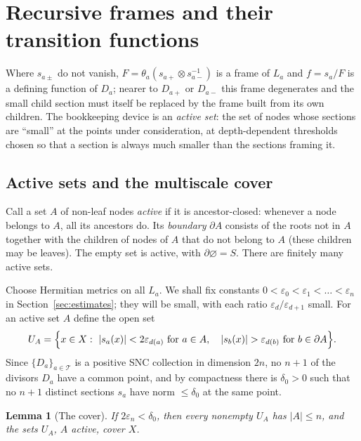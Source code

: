 \documentclass[11pt]{article}
\newtheorem{lemma}[theorem]{Lemma}
\theoremstyle{remark}
\newcommand{\eps}{\varepsilon}
\newcommand{\cT}{\mathcal T}
\begin{document}
\section{Recursive frames and their transition functions}\label{sec:frames}

Where $s_{a\pm}$ do not vanish, $F=\theta_a(s_{a+}\otimes s_{a-}^{-1})$
is a frame of $L_a$ and $f=s_a/F$ is a defining function of $D_a$;
nearer to $D_{a+}$ or $D_{a-}$ this frame degenerates and the small
child section must itself be replaced by the frame built from its own
children. The bookkeeping device is an \emph{active set}: the set of nodes
whose sections are ``small'' at the points under consideration, at
depth-dependent thresholds chosen so that a section is always much
smaller than the sections framing it.

\subsection*{Active sets and the multiscale cover}
Call a set $A$ of non-leaf nodes \emph{active} if it is
ancestor-closed: whenever a node belongs to $A$, all its ancestors do.
Its \emph{boundary} $\partial A$ consists of the roots not in $A$
together with the children of nodes of $A$ that do not belong to $A$
(these children may be leaves). The empty set is active, with
$\partial\varnothing=S$. There are finitely many active sets.

Choose Hermitian metrics on all $L_a$. We shall fix constants
$0<\eps_0<\eps_1<\dots<\eps_n$ in Section~\ref{sec:estimates}; they
will be small, with each ratio $\eps_d/\eps_{d+1}$ small. For an active
set $A$ define the open set
\begin{equation}\label{eq:UA}
 U_A=\Bigl\{x\in X:\
 |s_a(x)|<2\eps_{d(a)}\ \text{for }a\in A,\quad
 |s_b(x)|>\eps_{d(b)}\ \text{for }b\in\partial A\Bigr\}.
\end{equation}
Since $\{D_a\}_{a\in\cT}$ is a
positive SNC collection in dimension $2n$, no $n+1$ of the divisors
$D_a$ have a common point, and by compactness there is $\delta_0>0$
such that no $n+1$ distinct sections $s_a$ have norm $\le\delta_0$ at
the same point.

\begin{lemma}[The cover]\label{lem:cover}
If $2\eps_n<\delta_0$, then every nonempty $U_A$ has $|A|\le n$, and
the sets $U_A$, $A$ active, cover $X$.
\end{lemma}
\end{document}
